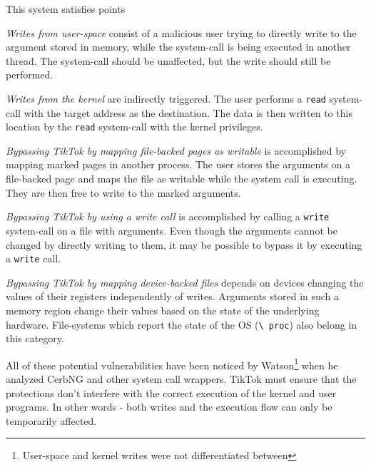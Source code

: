 This system satisfies points 

\emph{Writes from user-space} consist of a malicious user trying to directly
write to the argument stored in memory, while the system-call is being executed
in another thread. The system-call should be unaffected, but the write should
still be performed.

\emph{Writes from the kernel} are indirectly triggered. The user performs a \texttt{read}
system-call with the target address as the destination. The data is then written
to this location by the \texttt{read} system-call with the kernel privileges.

\emph{Bypassing TikTok by mapping file-backed pages as writable} is accomplished
by mapping marked pages in another process. The user stores the arguments on a
file-backed page and maps the file as writable while the system call is executing.
They are then free to write to the marked arguments.

\emph{Bypassing TikTok by using a write call} is accomplished by calling a
\texttt{write} system-call on a file with arguments. Even though the arguments
cannot be changed by directly writing to them, it may be possible to bypass it
by executing a \texttt{write} call.

\emph{Bypassing TikTok by mapping device-backed files} depends on devices
changing the values of their registers independently of writes. Arguments stored
in such a memory region change their values based on the state of the underlying
hardware. File-systems which report the state of the OS (\texttt{\textbackslash
proc}) also belong in this category.

All of these potential vulnerabilities have been noticed by
Watson\footnote{User-space and kernel writes were not differentiated between}
when he analyzed CerbNG\cite{watson2007exploiting} and other system call
wrappers. TikTok must ensure that the protections don't interfere with the
correct execution of the kernel and user programs. In other words - both writes
and the execution flow can only be temporarily affected.

